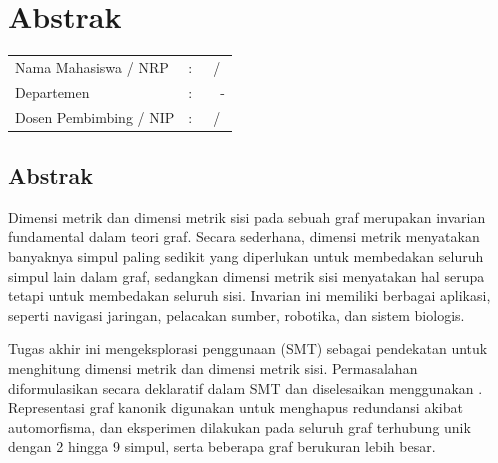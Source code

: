 \chapter*{Abstrak}

\noindent
\begin{center}
	\begin{minipage}{0.9\linewidth}
		\centering
		\textbf{\MakeUppercase{\titleBahasa}}
	\end{minipage}
\end{center}

\vspace{2em}

\noindent
\begin{center}
	\renewcommand{\arraystretch}{1.25}
	\begin{tabularx}{0.75\linewidth}{@{}l@{\ }l@{\enspace}X}
		Nama Mahasiswa / NRP &:& \theAuthor\ / \theAuthorId \\
		Departemen &:& \departmentNameHeadlessBahasa\ \facultyNameBahasaAbbreviated\ - \campusNameAbbreviated \\
		Dosen Pembimbing / NIP &:& \supervisor\ / \supervisorId
	\end{tabularx}
\end{center}

\vspace{1em}

\section*{Abstrak}

Dimensi metrik dan dimensi metrik sisi pada sebuah graf merupakan invarian fundamental dalam teori graf. Secara sederhana, dimensi metrik menyatakan banyaknya simpul paling sedikit yang diperlukan untuk membedakan seluruh simpul lain dalam graf, sedangkan dimensi metrik sisi menyatakan hal serupa tetapi untuk membedakan seluruh sisi. Invarian ini memiliki berbagai aplikasi, seperti navigasi jaringan, pelacakan sumber, robotika, dan sistem biologis.

Tugas akhir ini mengeksplorasi penggunaan  (SMT) sebagai pendekatan untuk menghitung dimensi metrik dan dimensi metrik sisi. Permasalahan diformulasikan secara deklaratif dalam SMT dan diselesaikan menggunakan . Representasi graf kanonik digunakan untuk menghapus redundansi akibat automorfisma, dan eksperimen dilakukan pada seluruh graf terhubung unik dengan 2 hingga 9 simpul, serta beberapa graf berukuran lebih besar.

